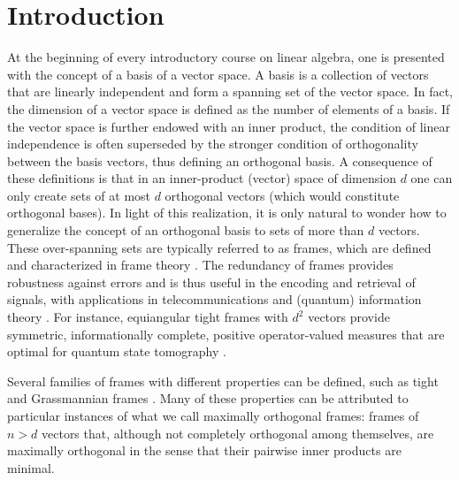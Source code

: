\documentclass[%
superscriptaddress,
amsmath,amssymb,
 aps,
pra,
floatfix,
]{revtex4-2}
\begin{document}
\maketitle





\section{Introduction}
\label{intro}

At the beginning of every introductory course on linear algebra, one is presented with the concept of a basis of a vector space. A basis is a collection of vectors that are linearly independent and form a spanning set of the vector space. In fact, the dimension of a vector space is defined as the number of elements of a basis. If the vector space is further endowed with an inner product, the condition of linear independence is often superseded by the stronger condition of orthogonality between the basis vectors, thus defining an orthogonal basis.  A consequence of these definitions is that in an inner-product (vector) space of dimension $d$ one can only create sets of at most $d$ orthogonal vectors (which would constitute orthogonal bases). In light of this realization, it is only natural to wonder how to generalize the concept of an orthogonal basis to sets of more than $d$ vectors. These over-spanning sets are typically referred to as frames, which are defined and characterized in frame theory \cite{duffin1952a, daubechies1992ten}. The redundancy of frames provides robustness against errors and is thus useful in the encoding and retrieval of signals, with applications in telecommunications and (quantum) information theory \cite{casazza2013finite}. For instance, equiangular tight frames with $d^2$ vectors provide symmetric, informationally complete, positive operator-valued measures that are optimal for quantum state tomography \cite{renes2004symmetric, scott2006tight, slomczynski2015highly, yoshida2022construction, gu2020fast, jameson2024optimal}.

Several families of frames with different properties can be defined, such as tight and Grassmannian frames \cite{strohmer2003grassmannian}. Many of these properties can be attributed to particular instances of what we call maximally orthogonal frames: frames of $n > d$ vectors that, although not completely orthogonal among themselves, are maximally orthogonal in the sense that their pairwise inner products are minimal.
\end{document}
